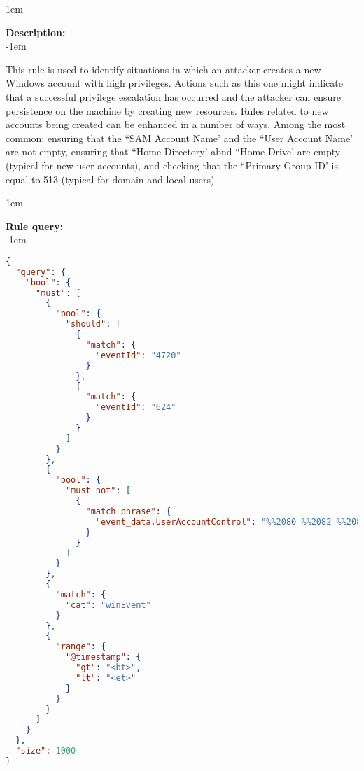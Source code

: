 \openup 1em

{\bf Description:} \\

\openup -1em
\vspace{-2em}


This rule is used to identify situations in which an attacker creates a new Windows account with high privileges. Actions such as this one might indicate that a successful privilege escalation has occurred and the attacker can ensure persistence on the machine by creating new resources. Rules related to new accounts being created can be enhanced in a number of ways. Among the most common: ensuring that the ``SAM Account Name' and the ``User Account Name' are not empty, ensuring that ``Home Directory' abnd ``Home Drive' are empty (typical for new user accounts), and checking that the ``Primary Group ID' is equal to 513 (typical for domain and local users).

\openup 1em

{\bf Rule query:} \\

\openup -1em
\vspace{-2em}

\begin{lstlisting}[language=json,firstnumber=1]
{
  "query": {
    "bool": {
      "must": [
        {
          "bool": {
            "should": [
              {
                "match": {
                  "eventId": "4720"
                }
              },
              {
                "match": {
                  "eventId": "624"
                }
              }
            ]
          }
        },
        {
          "bool": {
            "must_not": [
              {
                "match_phrase": {
                  "event_data.UserAccountControl": "%%2080 %%2082 %%2084"
                }
              }
            ]
          }
        },
        {
          "match": {
            "cat": "winEvent"
          }
        },
        {
          "range": {
            "@timestamp": {
              "gt": "<bt>",
              "lt": "<et>"
            }
          }
        }
      ]
    }
  },
  "size": 1000
}
\end{lstlisting}

